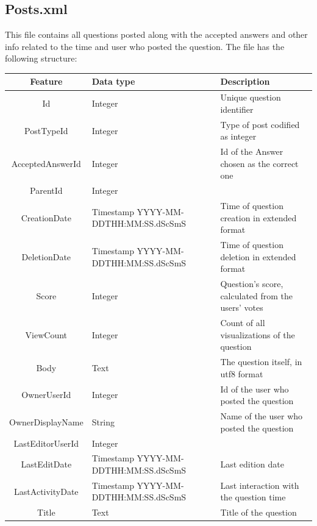 \documentclass[11pt]{book} %
\begin{document}
\newpage

    \subsection{Posts.xml}

      This file contains all questions posted along with the accepted answers and other info related to the time and user who posted the question. The file has the following structure:

      \begin{table}[!ht]
        \centering
        \begin{tabular}{|c|p{}|p{}|}
          \hline

          Feature & Data type & Description \\ \hline
          Id & Integer & Unique question identifier \\ \hline
          PostTypeId & Integer & Type of post codified as integer \\ \hline
          AcceptedAnswerId & Integer & Id of the Answer chosen as the correct one \\ \hline
          ParentId & Integer & \\ \hline
          CreationDate & Timestamp YYYY-MM-DDTHH:MM:SS.dScSmS & Time of question creation in extended format \\ \hline
          DeletionDate & Timestamp YYYY-MM-DDTHH:MM:SS.dScSmS & Time of question deletion in extended format \\ \hline
          Score & Integer & Question's score, calculated from the users' votes \\ \hline
          ViewCount & Integer & Count of all visualizations of the question \\ \hline
          Body & Text & The question itself, in utf8 format \\ \hline
          OwnerUserId & Integer & Id of the user who posted the question \\ \hline
          OwnerDisplayName & String & Name of the user who posted the question \\ \hline
          LastEditorUserId & Integer & \\ \hline
          LastEditDate & Timestamp YYYY-MM-DDTHH:MM:SS.dScSmS & Last edition date \\ \hline
          LastActivityDate & Timestamp YYYY-MM-DDTHH:MM:SS.dScSmS & Last interaction with the question time \\ \hline
          Title & Text & Title of the question \\ \hline

\end{tabular}
\end{table}
\end{document}
